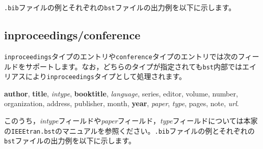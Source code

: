 \documentclass[10pt, a4paper, dvipdfmx, uplatex]{jsarticle} %
\renewcommand{\refname}{\small 参考文献}
\newcommand{\putlst}[1]{
  \noindent\makebox[\linewidth]{\rule{\linewidth}{0.4pt}}\vspace{-1.5zw}
  \vspace{-1.8zw}
  \noindent\makebox[\linewidth]{\rule{\linewidth}{0.4pt}}\vspace{0.5zw}\par
}
\begin{document}
\texttt{.bib}ファイルの例とそれぞれの\texttt{bst}ファイルの出力例を以下に示します。

\putlst{book.bib}

\begin{bibunit}[IEEJtran]
  \nocite{Book,jpBook1,jpBook2,jpBook3,enBook1}
  \renewcommand{\refname}{\small 参考文献(IEEJtran.bst)}
  {\small \putbib[./book]}
\end{bibunit}
\begin{bibunit}[jIEEEtran]
  \nocite{Book,jpBook1,jpBook2,jpBook3,enBook1}
  \renewcommand{\refname}{\small 参考文献(jIEEEtran.bst)}
  {\small \putbib[./book]}
\end{bibunit}
\begin{bibunit}[IEEJtran]
  \nocite{enjBook1/ej/jpjBook1}
  \renewcommand{\refname}{\small 英日を併記した参考文献(IEEJtran.bst)}
  {\small \putbib[./book]}
\end{bibunit}
\begin{bibunit}[jIEEEtran]
  \nocite{enjBook1/ej/jpjBook1}
  \renewcommand{\refname}{\small 英日を併記した参考文献(jIEEEtran.bst)}
  {\small \putbib[./book]}
\end{bibunit}


\subsection{inproceedings/conference}

\texttt{inproceedings}タイプのエントリや\texttt{conference}タイプのエントリでは次のフィールドをサポートします。なお，どちらのタイプが指定されても\texttt{bst}内部ではエイリアスにより\texttt{inproceedings}タイプとして処理されます。
\begin{center}
  \textbf{author}, \textbf{title}, \textsl{intype}, \textbf{booktitle}, \textsl{language}, series, editor, volume, number, \\
  organization, address, publisher, month, \textbf{year}, \textsl{paper}, \textsl{type}, pages, note, \textsl{url}.
\end{center}
このうち，\textsl{intype}フィールドや\textsl{paper}フィールド，\textsl{type}フィールドについては本家の\texttt{IEEEtran.bst}のマニュアルを参照ください。\texttt{.bib}ファイルの例とそれぞれの\texttt{bst}ファイルの出力例を以下に示します。

\putlst{inproceedings.bib}
\end{document}
